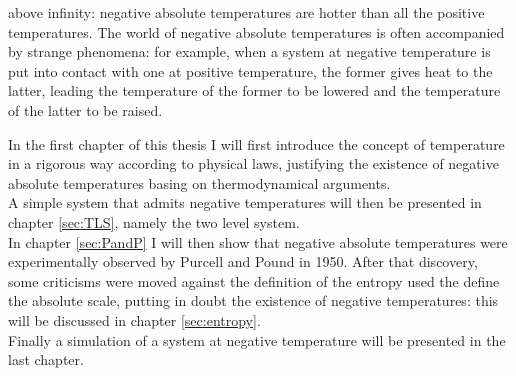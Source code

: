 above infinity: negative absolute temperatures are hotter than all the positive temperatures. The world of negative absolute temperatures is often accompanied by strange phenomena: for example, when a system at negative temperature is put into contact with one at positive temperature, the former gives heat to the latter,
leading the temperature of the former to be lowered and the temperature of the latter to be raised. \par
\vspace{10pt}
In the first chapter of this thesis I will first introduce the concept of temperature in a rigorous way according to physical laws, justifying the existence of negative absolute temperatures basing on thermodynamical arguments. \\
A simple system that admits negative temperatures will then be presented in chapter \ref{sec:TLS}, namely the two level system. \\
In chapter \ref{sec:PandP} I will then show that negative absolute temperatures were experimentally observed by Purcell and Pound in 1950. 
After that discovery, some criticisms were moved against the definition of the entropy used the define the absolute scale, putting in doubt the existence of negative temperatures: this will be discussed in chapter \ref{sec:entropy}. \\
Finally a simulation of a system at negative temperature will be presented in the last chapter.